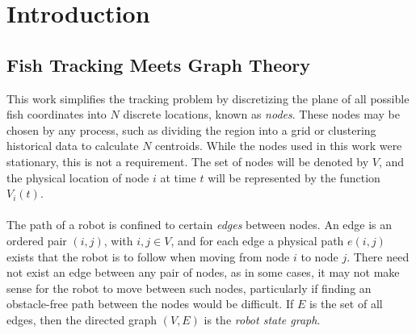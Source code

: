 \documentclass[11pt,letterpaper]{article}
\author{Kevin Smith}
\begin{document}
	
	\section{Introduction}
	
	\subsection{Fish Tracking Meets Graph Theory}
	
	This work simplifies the tracking problem by discretizing the plane of all possible fish coordinates into $N$ discrete locations, known as \textit{nodes}. These nodes may be chosen by any process, such as dividing the region into a grid or clustering historical data to calculate $N$ centroids. While the nodes used in this work were stationary, this is not a requirement. The set of nodes will be denoted by $V$, and the physical location of node $i$ at time $t$ will be represented by the function $V_i(t)$.
	\\\\
	The path of a robot is confined to certain \textit{edges} between nodes. An edge is an ordered pair $(i, j)$, with $i, j \in V$, and for each edge a physical path $e(i, j)$ exists that the robot is to follow when moving from node $i$ to node $j$. There need not exist an edge between any pair of nodes, as in some cases, it may not make sense for the robot to move between such nodes, particularly if finding an obstacle-free path between the nodes would be difficult. If $E$ is the set of all edges, then the directed graph $(V, E)$ is the \textit{robot state graph}.
	
\end{document}
